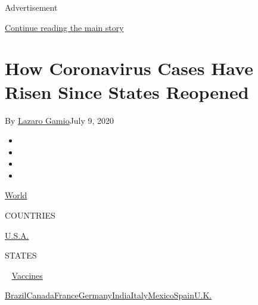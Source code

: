 Advertisement

\protect\hyperlink{after-top}{Continue reading the main story}

\hypertarget{how-coronavirus-cases-have-risen-since-states-reopened}{%
\section{How Coronavirus Cases Have Risen Since States
Reopened}\label{how-coronavirus-cases-have-risen-since-states-reopened}}

By \href{https://www.nytimes.com/by/lazaro-gamio}{Lazaro Gamio}July 9,
2020

\begin{itemize}
\item
\item
\item
\item
\end{itemize}

\href{https://www.nytimes.com/interactive/2020/world/coronavirus-maps.html}{World}~

COUNTRIES

\textbar{}
\href{https://www.nytimes.com/interactive/2020/us/coronavirus-us-cases.html}{U.S.A.}~

STATES

~
\href{https://www.nytimes.com/interactive/2020/science/coronavirus-vaccine-tracker.html}{Vaccines}

\href{https://www.nytimes.com/interactive/2020/world/americas/brazil-coronavirus-cases.html}{Brazil}\href{https://www.nytimes.com/interactive/2020/world/canada/canada-coronavirus-cases.html}{Canada}\href{https://www.nytimes.com/interactive/2020/world/europe/france-coronavirus-cases.html}{France}\href{https://www.nytimes.com/interactive/2020/world/europe/germany-coronavirus-cases.html}{Germany}\href{https://www.nytimes.com/interactive/2020/world/asia/india-coronavirus-cases.html}{India}\href{https://www.nytimes.com/interactive/2020/world/europe/italy-coronavirus-cases.html}{Italy}\href{https://www.nytimes.com/interactive/2020/world/americas/mexico-coronavirus-cases.html}{Mexico}\href{https://www.nytimes.com/interactive/2020/world/europe/spain-coronavirus-cases.html}{Spain}\href{https://www.nytimes.com/interactive/2020/world/europe/united-kingdom-coronavirus-cases.html}{U.K.}


